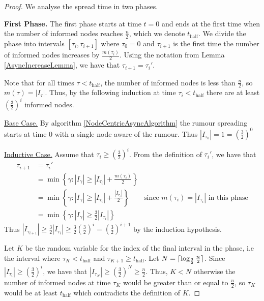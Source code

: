 \begin{proof}
	We analyse the spread time in two phases. 


	\textbf{First Phase.} The first phase starts at time $t=0$ and ends at the first time when the number of informed nodes reaches $\frac{n}{2}$, which we denote $t_\text{half}$. We divide the phase into intervals $[\tau_i, \tau_{i+1}]$ where $\tau_0 = 0$ and $\tau_{i+1}$ is the first time the number of informed nodes increases by $\frac{m(\tau_i)}{2}$. 
	Using the notation from Lemma \ref{AsyncIncreaseLemma}, we have that $\tau_{i+1} = \tau_i'$. 
	
	Note that for all times $\tau < t_\text{half}$, the number of informed nodes is less than $\frac{n}{2}$, so $m(\tau) = |I_\tau|$. Thus, by the following induction at time $\tau_i < t_\text{half}$ there are at least $(\frac{3}{2})^i$ informed nodes.

	\underline{Base Case.}
	By algorithm \ref{NodeCentricAsyncAlgorithm} the rumour spreading starts at time 0 with a single node aware of the rumour. Thus $|I_{\tau_0}| = 1 = (\frac{3}{2})^0$

	\underline{Inductive Case.} 
	Assume that $\tau_i \geq (\frac{3}{2})^i$.
	From the definition of $\tau_i'$, we have that 
	\begin{align*}
		\tau_{i+1} &= \tau_i' \\
		&= \min\left\{\gamma : |I_{\gamma}| \geq |I_{\tau_i}| + \frac{m(\tau_i)}{2}\right\} \\
		&= \min\left\{\gamma : |I_{\gamma}| \geq |I_{\tau_i}| + \frac{|I_{\tau_i}|}{2}\right\} & \text{since } m(\tau_i) = |I_{\tau _i}| \text{ in this phase} \\ 
		&= \min\left\{\gamma : |I_{\gamma}| \geq \frac{3}{2}|I_{\tau_i}|\right\} 
	\end{align*}
	Thus $|I_{\tau_{i+1}}| \geq \frac{3}{2}|I_{\tau_i}| \geq \frac{3}{2}(\frac{3}{2})^i = (\frac{3}{2})^{i+1}$ by the induction hypothesis. 
	
	Let $K$ be the random variable for the index of the final interval in the phase, i.e the interval where $\tau_K < t_\text{half}$ and $\tau_{K+1} \geq t_\text{half}$.
	Let $N = \lceil\log_\frac{3}{2}\frac{n}{2}\rceil$.  Since $|I_{\tau_i}| \geq (\frac{3}{2})^i$, we have that $|I_{\tau_N}| \geq (\frac{3}{2})^N \geq \frac{n}{2}$. Thus, $K < N$ otherwise the number of informed nodes at time $\tau_K$ would be greater than or equal to $\frac{n}{2}$, so $\tau_K$ would be at least $t_\text{half}$ which contradicts the definition of $K$.


\end{proof}
